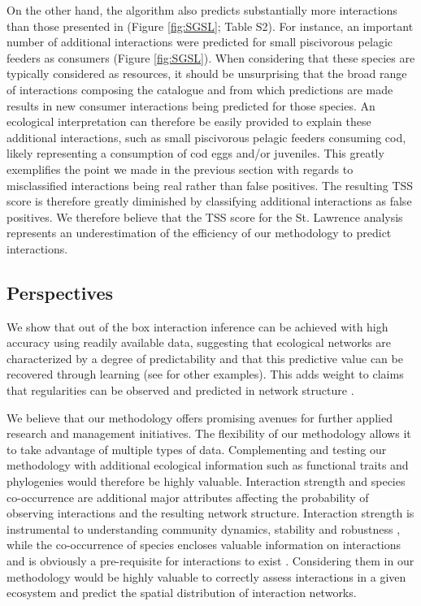 On the other hand, the algorithm also predicts substantially more interactions than those presented in \citet{savenkoff2004} (Figure \ref{fig:SGSL}; Table S2).  For instance, an important number of additional interactions were predicted for small piscivorous pelagic feeders as consumers (Figure \ref{fig:SGSL}). When considering that these species are typically considered as resources, it should be unsurprising that the broad range of interactions composing the catalogue and from which predictions are made results in new consumer interactions being predicted for those species. An ecological interpretation can therefore be easily provided to explain these additional interactions, such as small piscivorous pelagic feeders consuming cod, likely representing a consumption of cod eggs and/or juveniles. This greatly exemplifies the point we made in the previous section with regards to misclassified interactions being real rather than false positives. The resulting TSS score is therefore greatly diminished by classifying additional interactions as false positives. We therefore believe that the TSS score for the St. Lawrence analysis represents an underestimation of the efficiency of our methodology to predict interactions.

\subsection{Perspectives}

We show that out of the box interaction inference can be achieved with high accuracy using readily available data, suggesting that ecological networks are characterized by a degree of predictability and that this predictive value can be recovered through learning (see \cite{tamaddoni-nezhad2013, gray2015} for other examples). This adds weight to claims that regularities can be observed and predicted in network structure \citep{eklof2016}.

We believe that our methodology offers promising avenues for further applied research and management initiatives. The flexibility of our methodology allows it to take advantage of multiple types of data. Complementing and testing our methodology with additional ecological information such as functional traits and phylogenies would therefore be highly valuable. Interaction strength and species co-occurrence are additional major attributes affecting the probability of observing interactions and the resulting network structure. Interaction strength is instrumental to understanding community dynamics, stability and robustness \citep{laska1998, morales-castilla2015}, while the co-occurrence of species encloses valuable information on interactions and is obviously a pre-requisite for interactions to exist \citep{cazelles2016}. Considering them in our methodology would be highly valuable to correctly assess interactions in a given ecosystem and predict the spatial distribution of interaction networks.

